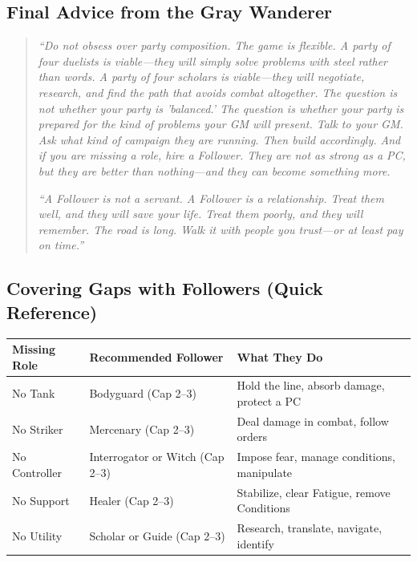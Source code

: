 \subsection{Final Advice from the Gray Wanderer}

\begin{quote}
\textit{``Do not obsess over party composition. The game is flexible. A party of four duelists is viable---they will simply solve problems with steel rather than words. A party of four scholars is viable---they will negotiate, research, and find the path that avoids combat altogether. The question is not whether your party is 'balanced.' The question is whether your party is prepared for the kind of problems your GM will present. Talk to your GM. Ask what kind of campaign they are running. Then build accordingly. And if you are missing a role, hire a Follower. They are not as strong as a PC, but they are better than nothing---and they can become something more.}

\textit{``A Follower is not a servant. A Follower is a relationship. Treat them well, and they will save your life. Treat them poorly, and they will remember. The road is long. Walk it with people you trust---or at least pay on time.''}
\end{quote}

\subsection{Covering Gaps with Followers (Quick Reference)}

\begin{center}
\begin{tabular}{p{3cm}|p{4cm}|p{4cm}}
\toprule
\textbf{Missing Role} & \textbf{Recommended Follower} & \textbf{What They Do} \\
\midrule
No Tank & Bodyguard (Cap 2--3) & Hold the line, absorb damage, protect a PC \\
No Striker & Mercenary (Cap 2--3) & Deal damage in combat, follow orders \\
No Controller & Interrogator or Witch (Cap 2--3) & Impose fear, manage conditions, manipulate \\
No Support & Healer (Cap 2--3) & Stabilize, clear Fatigue, remove Conditions \\
No Utility & Scholar or Guide (Cap 2--3) & Research, translate, navigate, identify \\
\bottomrule
\end{tabular}
\end{center}

